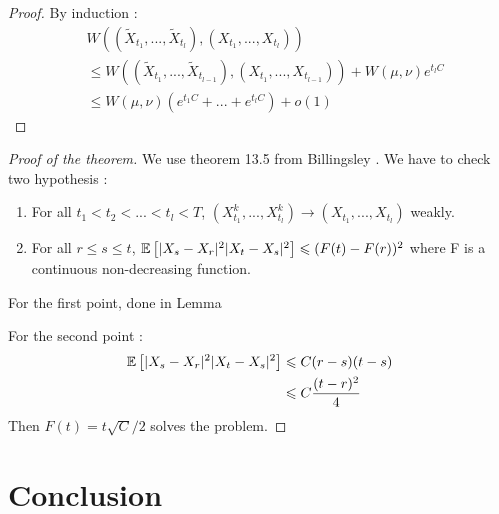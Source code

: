 \documentclass{article}
\begin{document}
\begin{proof}
  By induction :
  \begin{align}
    & W((\tilde X_{t_{1}}, ..., \tilde X_{t_{l}}), (X_{t_{1}}, ..., X_{t_{l}}))
    \\ &\leq  W((\tilde X_{t_{1}}, ..., \tilde X_{t_{l-1}}), (X_{t_{1}}, ..., X_{t_{l-1}})) + W(\mu,\nu)e^{t_{l}C}
    \\ &\leq W(\mu,\nu)(e^{t_{1}C}+...+e^{t_{l}C}) + o(1)
  \end{align}
\end{proof}



\begin{proof}[Proof of the theorem]
  We use theorem 13.5 from Billingsley . We have to check two hypothesis :
  \begin{enumerate}
  \item For all $t_{1}<t_{2}<...<t_{l}<T$, $(X_{t_{1}}^{k}, ..., X_{t_{l}}^{k}) \rightarrow (X_{t_{1}}, ..., X_{t_{l}})$ weakly.
  \item For all $r \leq s \leq t$, $\mathbb{E}\left[|X_{s}-X_{r}|^{2}|X_{t}-X_{s}|^{2}\right] \leqslant (F(t) - F(r))^{2}$ where F is a continuous non-decreasing function.
  \end{enumerate}
  For the first point, done in Lemma
  
  For the second point :
  \begin{align}
    \mathbb{E}\left[|X_{s}-X_{r}|^{2}|X_{t}-X_{s}|^{2}\right] &\leqslant C(r-s)(t-s)\\
    &\leqslant C\frac{(t-r)^{2}}{4}
  \end{align}
  Then $F(t) = t\sqrt{C}/2$ solves the problem.
\end{proof}







\section{Conclusion}
\label{sec:conclusion}
\end{document}
